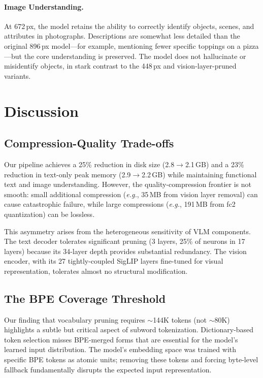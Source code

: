 \documentclass[11pt]{article}
\newcommand{\eg}{\textit{e.g.}}
\begin{document}
\paragraph{Image Understanding.} At 672\,px, the model retains the ability to correctly identify objects, scenes, and attributes in photographs. Descriptions are somewhat less detailed than the original 896\,px model---for example, mentioning fewer specific toppings on a pizza---but the core understanding is preserved. The model does not hallucinate or misidentify objects, in stark contrast to the 448\,px and vision-layer-pruned variants.

\section{Discussion}
\label{sec:discussion}

\subsection{Compression-Quality Trade-offs}

Our pipeline achieves a 25\% reduction in disk size (2.8$\rightarrow$2.1\,GB) and a 23\% reduction in text-only peak memory (2.9$\rightarrow$2.2\,GB) while maintaining functional text and image understanding. However, the quality-compression frontier is not smooth: small additional compression (\eg, 35\,MB from vision layer removal) can cause catastrophic failure, while large compressions (\eg, 191\,MB from fc2 quantization) can be lossless.

This asymmetry arises from the heterogeneous sensitivity of VLM components. The text decoder tolerates significant pruning (3 layers, 25\% of neurons in 17 layers) because its 34-layer depth provides substantial redundancy. The vision encoder, with its 27 tightly-coupled SigLIP layers fine-tuned for visual representation, tolerates almost no structural modification.

\subsection{The BPE Coverage Threshold}

Our finding that vocabulary pruning requires $\sim$144K tokens (not $\sim$80K) highlights a subtle but critical aspect of subword tokenization. Dictionary-based token selection misses BPE-merged forms that are essential for the model's learned input distribution. The model's embedding space was trained with specific BPE tokens as atomic units; removing these tokens and forcing byte-level fallback fundamentally disrupts the expected input representation.
\end{document}
